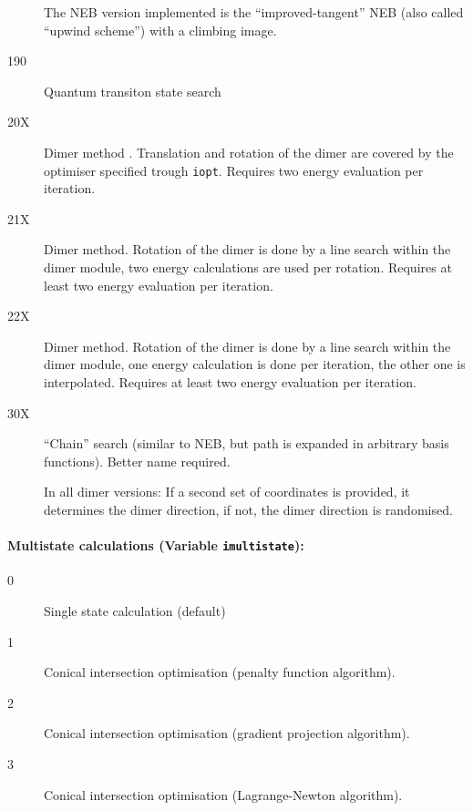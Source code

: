 \documentclass{article}
\begin{document}
\begin{description}
  The NEB version implemented is the ``improved-tangent'' NEB \cite{hen00a}
  (also called ``upwind scheme'') with a climbing image.

\item[190] Quantum transiton state search
  
\item[20X] Dimer method \cite{hen99,hey05}. Translation and rotation of the
  dimer are covered by the optimiser specified trough \texttt{iopt}. Requires
  two energy evaluation per iteration.
\item[21X] Dimer method. Rotation of the dimer is done by a line search within
  the dimer module, two energy calculations are used per rotation. Requires at
  least two energy evaluation per iteration.
\item[22X] Dimer method. Rotation of the dimer is done by a line search within
  the dimer module, one energy calculation is done per iteration, the other
  one is interpolated. Requires at least two energy evaluation per iteration.
  
\item[30X] ``Chain'' search (similar to NEB, but path is expanded in arbitrary basis functions). Better name required.

  In all dimer versions: If a second set of coordinates is provided, it
  determines the dimer direction, if not, the dimer direction is randomised.
\end{description}

\paragraph{Multistate calculations (Variable \texttt{imultistate}):}
\begin{description}
\item[0] Single state calculation (default)
\item[1] Conical intersection optimisation (penalty function algorithm).
\item[2] Conical intersection optimisation (gradient projection algorithm).
\item[3] Conical intersection optimisation (Lagrange-Newton algorithm).
\end{description}
\end{document}
